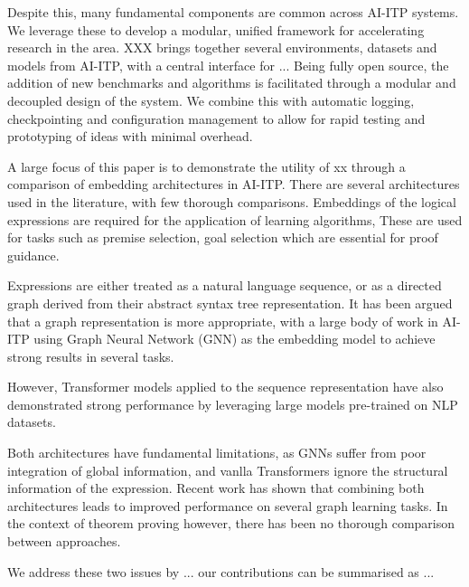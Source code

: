 \documentclass[letterpaper]{article} %
\begin{document}
    Despite this, many fundamental components are common across AI-ITP systems.
    We leverage these to develop a modular, unified framework for accelerating research in the area.
    XXX brings together several environments, datasets and models from AI-ITP, with a central interface
    for ...
    Being fully open source, the addition of new benchmarks and algorithms is facilitated
    through a modular and decoupled design of the system.
    We combine this with automatic logging, checkpointing and configuration management
    to allow for rapid testing and prototyping of ideas with minimal overhead.

    A large focus of this paper is to demonstrate the utility of xx through a comparison of embedding architectures in AI-ITP.
    There are several architectures used in the literature, with few thorough comparisons.
    Embeddings of the logical expressions are required for the application of learning algorithms,
    These are used for tasks such as premise selection, goal selection which are essential for proof guidance.

    Expressions are either treated as a natural language sequence, or as a directed graph derived from their abstract syntax tree
    representation. It has been argued that a graph representation is more appropriate, with a large body of work in AI-ITP
    using Graph Neural Network (GNN) as the embedding model to achieve strong results in several tasks.

    However, Transformer models applied to the sequence representation have also demonstrated strong performance by
    leveraging large models pre-trained on NLP datasets.

    Both architectures have fundamental limitations, as GNNs suffer from poor integration of global information, and vanlla
    Transformers ignore the structural information of the expression.
    Recent work has shown that combining both architectures leads to improved performance on several graph learning tasks.
    In the context of theorem proving however, there has been no thorough comparison between approaches.

    We address these two issues by ... our contributions can be summarised as ...

\end{document}

